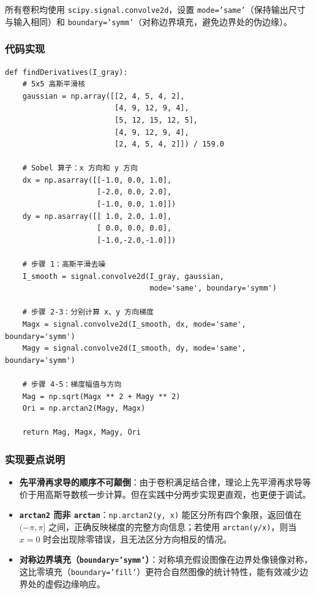 \documentclass[12pt,a4paper]{ctexart}
\begin{document}
所有卷积均使用 \texttt{scipy.signal.convolve2d}，设置 \texttt{mode='same'}（保持输出尺寸与输入相同）和 \texttt{boundary='symm'}（对称边界填充，避免边界处的伪边缘）。

\subsubsection{代码实现}

\begin{lstlisting}
def findDerivatives(I_gray):
    # 5x5 高斯平滑核
    gaussian = np.array([[2, 4, 5, 4, 2],
                         [4, 9, 12, 9, 4],
                         [5, 12, 15, 12, 5],
                         [4, 9, 12, 9, 4],
                         [2, 4, 5, 4, 2]]) / 159.0

    # Sobel 算子：x 方向和 y 方向
    dx = np.asarray([[-1.0, 0.0, 1.0],
                     [-2.0, 0.0, 2.0],
                     [-1.0, 0.0, 1.0]])
    dy = np.asarray([[ 1.0, 2.0, 1.0],
                     [ 0.0, 0.0, 0.0],
                     [-1.0,-2.0,-1.0]])

    # 步骤 1：高斯平滑去噪
    I_smooth = signal.convolve2d(I_gray, gaussian,
                                 mode='same', boundary='symm')

    # 步骤 2-3：分别计算 x、y 方向梯度
    Magx = signal.convolve2d(I_smooth, dx, mode='same', boundary='symm')
    Magy = signal.convolve2d(I_smooth, dy, mode='same', boundary='symm')

    # 步骤 4-5：梯度幅值与方向
    Mag = np.sqrt(Magx ** 2 + Magy ** 2)
    Ori = np.arctan2(Magy, Magx)

    return Mag, Magx, Magy, Ori
\end{lstlisting}

\subsubsection{实现要点说明}

\begin{itemize}
  \item \textbf{先平滑再求导的顺序不可颠倒}：由于卷积满足结合律，理论上先平滑再求导等价于用高斯导数核一步计算。但在实践中分两步实现更直观，也更便于调试。
  \item \textbf{\texttt{arctan2} 而非 \texttt{arctan}}：\texttt{np.arctan2(y, x)} 能区分所有四个象限，返回值在 $(-\pi, \pi]$ 之间，正确反映梯度的完整方向信息；若使用 \texttt{arctan(y/x)}，则当 $x=0$ 时会出现除零错误，且无法区分方向相反的情况。
  \item \textbf{对称边界填充（\texttt{boundary='symm'}）}：对称填充假设图像在边界处像镜像对称，这比零填充（\texttt{boundary='fill'}）更符合自然图像的统计特性，能有效减少边界处的虚假边缘响应。
\end{itemize}
\end{document}
